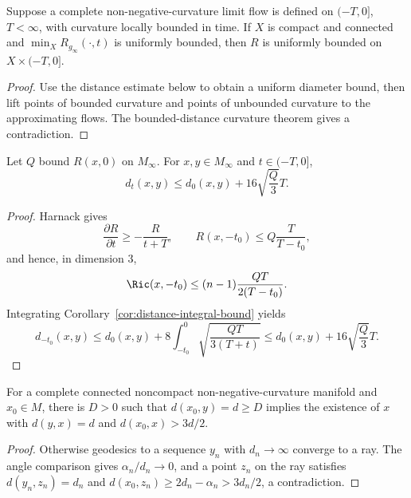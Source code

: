 \begin{lemma}
\label{lem:curvature-bound-compact-subset}\label{compactbd}
Suppose a complete non-negative-curvature limit flow is defined on $(-T,0]$,
$T<\infty$, with curvature locally bounded in time. If $X$ is compact and
connected and $\min_XR_{g_\infty}(\cdot,t)$ is uniformly bounded, then $R$ is
uniformly bounded on $X\times(-T,0]$.
\end{lemma}
\begin{proof}\sketch Use the
distance estimate below to obtain a uniform diameter bound, then lift points
of bounded curvature and points of unbounded curvature to the approximating
flows. The bounded-distance curvature theorem gives a contradiction.\end{proof}

\begin{claim}
\label{claim:distance-distortion-bound}\label{distch}
Let $Q$ bound $R(x,0)$ on $M_\infty$. For $x,y\in M_\infty$ and
$t\in(-T,0]$,
$$d_t(x,y)\le d_0(x,y)+16\sqrt{\frac Q3}T.$$
\end{claim}
\begin{proof}\sketch Harnack gives
$$\frac{\partial R}{\partial t}\ge-\frac R{t+T},\qquad
R(x,-t_0)\le Q\frac T{T-t_0},$$
and hence, in dimension $3$,
$$\Ric(x,-t_0)\le(n-1)\frac{QT}{2(T-t_0)}.$$
Integrating Corollary~\ref{cor:distance-integral-bound} yields
$$d_{-t_0}(x,y)\le d_0(x,y)+8\int_{-t_0}^0\sqrt{\frac{QT}{3(T+t)}}
\le d_0(x,y)+16\sqrt{\frac Q3}T.$$
\end{proof}

\begin{lemma}
\label{lem:far-point-with-distant-antipode}
For a complete connected noncompact non-negative-curvature manifold and
$x_0\in M$, there is $D>0$ such that $d(x_0,y)=d\ge D$ implies the existence
of $x$ with $d(y,x)=d$ and $d(x_0,x)>3d/2$.
\end{lemma}
\begin{proof}\sketch Otherwise geodesics to a
sequence $y_n$ with $d_n\to\infty$ converge to a ray. The angle comparison
gives $\alpha_n/d_n\to0$, and a point $z_n$ on the ray satisfies
$d(y_n,z_n)=d_n$ and $d(x_0,z_n)\ge2d_n-\alpha_n>3d_n/2$, a contradiction.\end{proof}

